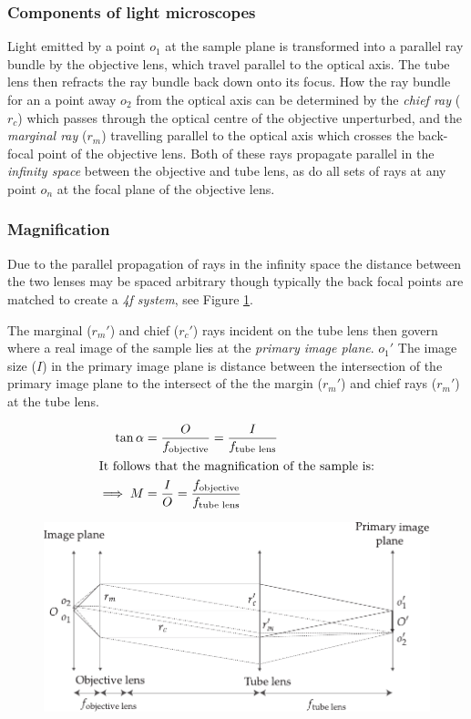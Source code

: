 \subsubsection{Components of light microscopes}
Light emitted by a point $o_1$ at the sample plane is transformed into a parallel ray bundle by the objective lens, which travel parallel to the optical axis.
The tube lens then refracts the ray bundle back down onto its focus.
How the ray bundle for an a point away $o_2$ from the optical axis can be determined by the \emph{chief ray} ($r_c$) which passes through the optical centre of the objective unperturbed, and the \emph{marginal ray} ($r_m$) travelling parallel to the optical axis which crosses the back-focal point of the objective lens.
Both of these rays propagate parallel in the \emph{infinity space} between the objective and tube lens, as do all sets of rays at any point $o_n$ at the focal plane of the objective lens.

\subsubsection{Magnification}

Due to the parallel propagation of rays in the infinity space the distance between the two lenses may be spaced arbitrary though typically the back focal points are matched to create a \emph{4f system}, see Figure \ref{fig:magnification}.

The marginal ($r_m'$) and chief ($r_c'$) rays incident on the tube lens then govern where a real image of the sample lies at the \emph{primary image plane}. %
$o_1'$
The image size ($I$) in the primary image plane is distance between the intersection of the primary image plane to the intersect of the the margin ($r_m'$) and chief rays ($r_m'$) at the tube lens.

\begin{align}
    \tan \alpha &= \frac{O}{f_{\text{objective}}} =  \frac{I}{f_{\text{tube lens}}} \\
    \intertext{It follows that the magnification of the sample is:}
    \implies M &= \frac{I}{O} = \frac{f_{\text{objective}}}
{f_{\text{tube lens}}}
\end{align}

\begin{figure}
    \includegraphics{./magnification}
    \caption{}
    \label{fig:magnification}
\end{figure}

